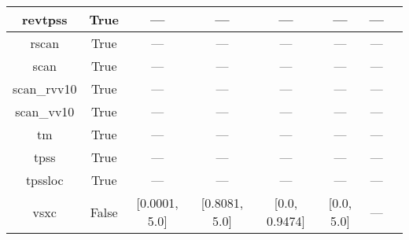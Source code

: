 \begin{tabular}{|c|c|c|c|c|c|c|l|}
       revtpss &                  True &               --- &               --- &               --- &            --- &        --- &                                      \cite{Perdew2009_026403,Perdew2009_026403_err} \\ \hline
         rscan &                  True &               --- &               --- &               --- &            --- &        --- &                                                            \cite{Bartok2019_161101} \\ \hline
          scan &                  True &               --- &               --- &               --- &            --- &        --- &                                                               \cite{Sun2015_036402} \\ \hline
   scan\_rvv10 &                  True &               --- &               --- &               --- &            --- &        --- &                                                              \cite{Peng2016_041005} \\ \hline
    scan\_vv10 &                  True &               --- &               --- &               --- &            --- &        --- &                                                       \cite{Brandenburg2016_115144} \\ \hline
            tm &                  True &               --- &               --- &               --- &            --- &        --- &                                                               \cite{Tao2016_073001} \\ \hline
          tpss &                  True &               --- &               --- &               --- &            --- &        --- &                                               \cite{Tao2003_146401,Perdew2004_6898} \\ \hline
       tpssloc &                  True &               --- &               --- &               --- &            --- &        --- &                                                        \cite{Constantin2012_035130} \\ \hline
          vsxc &                 False &     [0.0001, 5.0] &     [0.8081, 5.0] &     [0.0, 0.9474] &     [0.0, 5.0] &        --- &                                                           \cite{VanVoorhis1998_400} \\ \hline
\end{tabular}